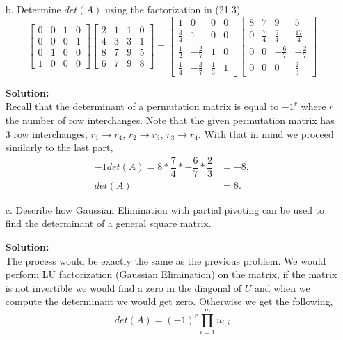\documentclass[12pt]{article}
\makeatletter
\theoremstyle{homework}
\newenvironment{exercise}[1]
{\def\@currentlabel{#1}\exercisecore}
{\endexercisecore}
\newcommand{\localhead}[1]{\par\smallskip\noindent\textbf{#1}\nobreak\\}%
\newcommand\solution{\localhead{Solution:}}
\makeatother
\begin{document}
\begin{exercise}{21.1}
\begin{enumerate}
    \item[b.] Determine $det(A)$ using the factorization in (21.3)
    \begin{equation*}
      \begin{bmatrix}
        0&0&1&0\\
        0&0&0&1\\
        0&1&0&0\\
        1&0&0&0
      \end{bmatrix}
      \begin{bmatrix}
        2& 1 &1 &0\\ 
        4& 3 &3 &1\\
        8& 7 &9 &5\\
        6& 7 &9 &8
      \end{bmatrix}
       = 
       \begin{bmatrix}
        1 & 0 & 0 & 0\\
         \frac{3}{4} & 1 & 0 & 0\\
         \frac{1}{2} &-\frac{2}{7}& 1&0\\
         \frac{1}{4} &-\frac{3}{7}& \frac{1}{3} & 1
       \end{bmatrix}
       \begin{bmatrix}8&7&9&5\\ 0&\frac{7}{4}&\frac{9}{4}&\frac{17}{4}\\ 0&0&-\frac{6}{7}&-\frac{2}{7}\\ 0&0&0&\frac{2}{3}\end{bmatrix}
    \end{equation*} 
    \solution Recall that the determinant of a permutation matrix is equal to $-1^{r}$ where $r$ the number of row interchanges. Note that the given permutation matrix has 3 row interchanges, 
    $r_1 \rightarrow r_4$, $r_2 \rightarrow r_3$, $r_3 \rightarrow r_4$. With that in mind we proceed
    similarly to the last part, 
    \begin{align*}
      -1 det(A) = 8*\dfrac{7}{4}*-\dfrac{6}{7}*\dfrac{2}{3} &= -8,\\
      det(A) &= 8.
    \end{align*}
    
    \vspace{.15in}

    \item[c.] Describe how Gaussian Elimination with partial pivoting can be used to find the determinant of a general square matrix. \\
    \solution The process would be exactly the same as the previous problem. We would perform LU factorization (Gaussian Elimination) on the matrix, if the matrix is 
    not invertible we would find a zero in the diagonal of $U$ and when we compute the determinant we would get zero. Otherwise we get the following, 
    \begin{equation*}
      det(A) = (-1)^r\prod_{i = 1}^m u_{i,i}
    \end{equation*}
  \end{enumerate}


\end{exercise}
\end{document}
